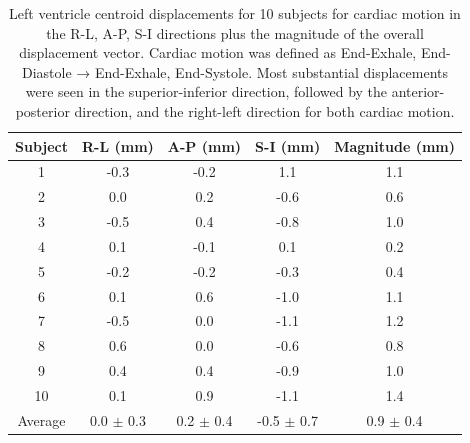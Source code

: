 \begin{table}[ht]
    \centering
    \caption[Cardiac LV motion measurements per subject.]{Left ventricle centroid displacements for 10 subjects for cardiac motion in the R-L, A-P, S-I directions plus the magnitude of the overall displacement vector. Cardiac motion was defined as End-Exhale, End-Diastole → End-Exhale, End-Systole. Most substantial displacements were seen in the superior-inferior direction, followed by the anterior-posterior direction, and the right-left direction for both cardiac motion.}\label{tab:card_displacement}
    \small
    \ifFinal{}
    \fi
    \vspace{0.25cm}
    \begin{tabular}{ccccc}
        \toprule
        \textbf{Subject} & \textbf{R-L (mm)} & \textbf{A-P (mm)} & \textbf{S-I (mm)} & \textbf{Magnitude (mm)} \\
        \midrule
        1  & -0.3 & -0.2 &  1.1 & 1.1 \\
        2  &  0.0 &  0.2 & -0.6 & 0.6 \\
        3  & -0.5 &  0.4 & -0.8 & 1.0 \\
        4  &  0.1 & -0.1 &  0.1 & 0.2 \\
        5  & -0.2 & -0.2 & -0.3 & 0.4 \\
        6  &  0.1 &  0.6 & -1.0 & 1.1 \\
        7  & -0.5 &  0.0 & -1.1 & 1.2 \\
        8  &  0.6 &  0.0 & -0.6 & 0.8 \\
        9  &  0.4 &  0.4 & -0.9 & 1.0 \\
        10 &  0.1 &  0.9 & -1.1 & 1.4 \\
        \midrule
        Average & 0.0 $\pm$ 0.3 & 0.2 $\pm$ 0.4 & -0.5 $\pm$ 0.7 & 0.9 $\pm$ 0.4 \\
        \bottomrule
    \end{tabular}
\end{table}

